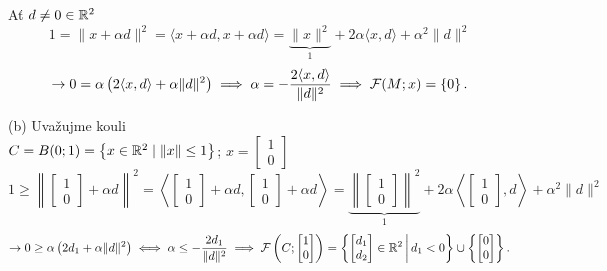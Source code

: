 Ať $d \not = 0 \in \mathbb{R}^2$
\[
    1 = \| x + \alpha d\|^2 = \langle x + \alpha d , x + \alpha d\rangle = \underbrace{\| x\|^2}_{1} + 2 \alpha
    \langle x, d\rangle + \alpha^2 \|d\|^2
\]
\[
    \rightarrow 0 = \alpha \left(2 \langle x, d\rangle + \alpha \| d\|^2\right) \implies \alpha =
    - \frac{2 \langle x,d\rangle}{\|d\|^2} \implies \mathcal{F}(M;x) = \left\lbrace 0 \right\rbrace.
\]

(b) Uvažujme kouli \\
$C = B(0; 1) = \left\lbrace x \in \mathbb{R}^2 \mid \| x\| \leq 1 \right\rbrace$; $x =
\begin{bmatrix}
    1 \\
    0
\end{bmatrix}$
\[
    1 \geq \left\|
    \begin{bmatrix}
        1 \\
        0
    \end{bmatrix} + \alpha d\right\|^2 = \left\langle
        \begin{bmatrix}
        1 \\
        0
    \end{bmatrix} + \alpha d ,
    \begin{bmatrix}
        1 \\
        0
    \end{bmatrix} + \alpha d\right\rangle = \underbrace{\left\|
    \begin{bmatrix}
        1 \\
        0
    \end{bmatrix}\right\|^2}_{1} + 2 \alpha
    \left\langle
    \begin{bmatrix}
        1 \\
        0
    \end{bmatrix}, d\right\rangle + \alpha^2 \|d\|^2
\]
\[
    \rightarrow 0 \geq \alpha \left(2 d_1 + \alpha \| d\|^2\right) \iff \alpha \leq 
    - \frac{2 d_1}{\|d\|^2} \implies \mathcal{F}\left(C;
    \begin{bmatrix}
        1 \\
        0
    \end{bmatrix}\right) = \left\lbrace 
    \begin{bmatrix}
        d_1 \\
        d_2
    \end{bmatrix} \in \mathbb{R}^2 \, \middle| \, d_1 < 0
     \right\rbrace \cup \left\lbrace 
    \begin{bmatrix}
        0 \\ 0
    \end{bmatrix} \right\rbrace.
\]

